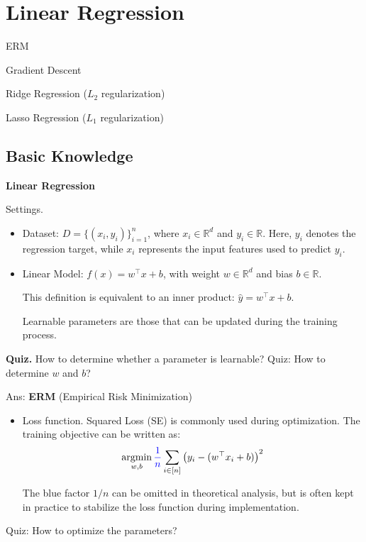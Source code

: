 \documentclass[../main]{subfiles}
\begin{document}
\chapter{Linear Regression}
\begin{introduction}
\item ERM
\item Gradient Descent
\item Ridge Regression ($L_2$ regularization)
\item Lasso Regression ($L_1$ regularization)
\end{introduction}
\section{Basic Knowledge}
\begin{example}
\textbf{Linear Regression}
\end{example}

{Settings.}
\begin{itemize}
  \item Dataset: $D=\{(x_i,y_i)\}_{i=1}^n$, where $x_i\in\mathbb{R}^d$ and $y_i\in\mathbb{R}$.  
  Here, $y_i$ denotes the regression target, while $x_i$ represents the input features used to predict $y_i$.

  \item Linear Model: $f(x)=w^{\top}x+b$, with weight $w\in\mathbb{R}^d$ and bias $b\in\mathbb{R}$.  
  \begin{note}
    This definition is equivalent to an inner product:  
    $\hat y = w^{\top}x+b.$
  \end{note}

  \begin{definition}
    Learnable parameters are those that can be updated during the training process.
  \end{definition}
\end{itemize}

\textbf{Quiz.} How to determine whether a parameter is learnable?
Quiz: How to determine $w$ and $b$?

\noindent Ans: \textbf{ERM} (Empirical Risk Minimization)

\begin{itemize}
  \item Loss function. Squared Loss (SE) is commonly used during optimization. The training objective can be written as:
    \begin{equation}
        \mathop{\mathrm{argmin}}_{w,b}{\color{blue}{\frac{1}{n}}}\sum_{i\in[n]}\left(y_i-(w^\top x_i+b)\right)^2
      \end{equation}
  
  The blue factor $1/n$ can be omitted in theoretical analysis, but is often kept in practice to stabilize the loss function during implementation.
\end{itemize}
Quiz: How to optimize the parameters?
\end{document}
